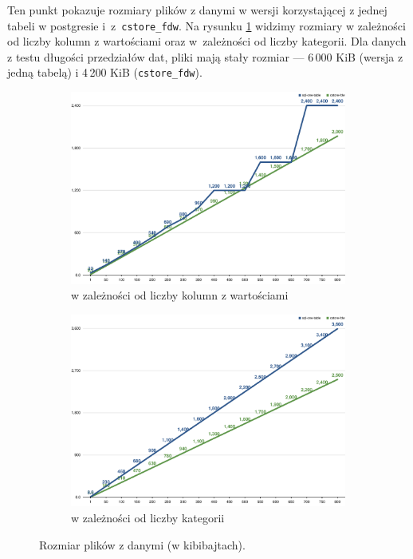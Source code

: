 \documentclass[a4paper,11pt]{article}
\begin{document}
Ten punkt pokazuje rozmiary plików z danymi w wersji korzystającej z jednej tabeli w postgresie
i~z~\texttt{cstore\_fdw}. Na rysunku \ref{size-of-data-file} widzimy rozmiary w zależności od liczby
kolumn z wartościami oraz w~zależności od liczby kategorii. Dla danych z testu długości przedziałów dat,
pliki mają stały rozmiar --- 6\,000 KiB (wersja z jedną tabelą) i 4\,200 KiB (\texttt{cstore\_fdw}).
\begin{figure}[h!]
    \centering
    \begin{subfigure}{.49\textwidth}
        \centering
        \includegraphics[width=\textwidth]{charts/size-of-data-file-number_of_values}
        \caption{w zależności od liczby kolumn z wartościami}
    \end{subfigure}
    \hfill
    \begin{subfigure}{.49\textwidth}
        \centering
        \includegraphics[width=\textwidth]{charts/size-of-data-file-number_of_categories}
        \caption{w zależności od liczby kategorii}
    \end{subfigure}
    \caption{Rozmiar plików z danymi (w kibibajtach).}
    \label{size-of-data-file}
\end{figure}
\end{document}
